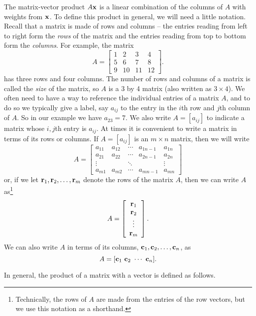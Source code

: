The matrix-vector product $A \mathbf{x}$ is a linear combination of the columns of $A$ with weights from $\mathbf{x}$. To define this product in general, we will need a little notation. Recall that a matrix is made of rows and columns -- the entries reading from left to right form the \emph{rows} of the matrix and the entries reading from top to bottom form the \emph{columns}. For example, the matrix  
\[A = \left[ \begin{array}{cccc} 1 & 2 & 3 & 4 \\ 5 & 6 & 7 & 8  \\ 9 & 10 & 11 & 12 \end{array} \right].\]
has three rows and four columns. The number of rows and columns of a matrix is called the \emph{size} of the matrix, so $A$ is a 3 by 4 matrix (also written as $3 \times 4$). We often need to have a way to reference the individual entries of a matrix $A$, and to do so we typically give a label, say $a_{ij}$ to the entry in the $i$th row and $j$th column of $A$. So in our example we have $a_{23}=7$. We also write $A = [a_{ij}]$ to indicate a matrix whose $i,j$th entry is $a_{ij}$. At times it is convenient to write a matrix in terms of its rows or columns. If $A = [a_{ij}]$ is an $m \times n$ matrix, then we will write
\[A = \left[ \begin{array}{ccccc}
a_{11} & a_{12}  & \cdots    & a_{1n-1} & a_{1n} \\
a_{21} & a_{22}  & \cdots    & a_{2n-1} & a_{2n} \\
 \vdots &         & \ddots    &     &\vdots \\
a_{m1} & a_{m2}  & \cdots    & a_{mn-1} & a_{mn}
\end{array} \right]\]
or, if we let $\mathbf{r}_1, \mathbf{r}_2, \ldots, \mathbf{r}_m$ denote the rows of the matrix $A$, then we can write $A$ as\footnote{Technically, the rows of $A$ are made from the entries of the row vectors, but we use this notation as a shorthand.}
\[A = \left[ \begin{array}{c} \mathbf{r}_1 \\ \mathbf{r}_2 \\ \vdots \\ \mathbf{r}_m \end{array} \right].\]
We can also write $A$ in terms of its columns, $\mathbf{c}_1, \mathbf{c}_2, \ldots, \mathbf{c}_n$, as
\[A = [\vc_1 \ \vc_2 \ \cdots \ \vc_n].\]

In general, the product of a matrix with a vector is defined as follows. 



